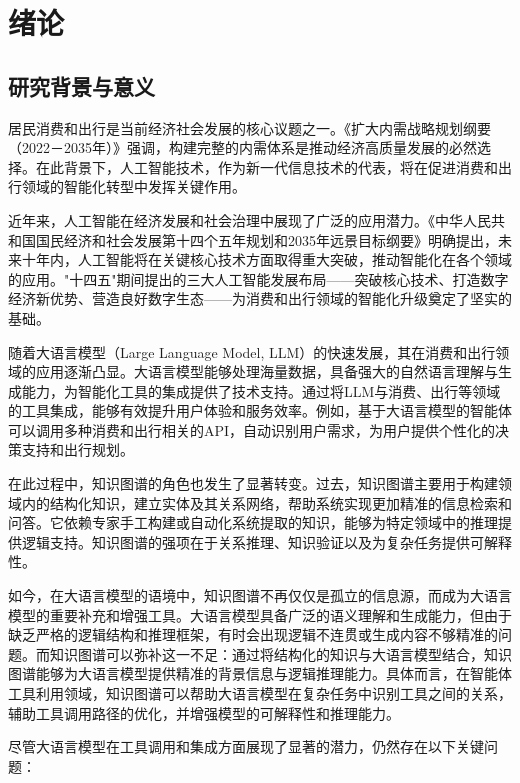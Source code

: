 
\chapter{绪论}

\section{研究背景与意义}

居民消费和出行是当前经济社会发展的核心议题之一。《扩大内需战略规划纲要（2022－2035年）》强调，构建完整的内需体系是推动经济高质量发展的必然选择。在此背景下，人工智能技术，作为新一代信息技术的代表，将在促进消费和出行领域的智能化转型中发挥关键作用。

近年来，人工智能在经济发展和社会治理中展现了广泛的应用潜力。《中华人民共和国国民经济和社会发展第十四个五年规划和2035年远景目标纲要》明确提出，未来十年内，人工智能将在关键核心技术方面取得重大突破，推动智能化在各个领域的应用。"十四五"期间提出的三大人工智能发展布局——突破核心技术、打造数字经济新优势、营造良好数字生态——为消费和出行领域的智能化升级奠定了坚实的基础。

随着大语言模型（Large Language Model, LLM）的快速发展，其在消费和出行领域的应用逐渐凸显。大语言模型能够处理海量数据，具备强大的自然语言理解与生成能力，为智能化工具的集成提供了技术支持。通过将LLM与消费、出行等领域的工具集成，能够有效提升用户体验和服务效率。例如，基于大语言模型的智能体可以调用多种消费和出行相关的API，自动识别用户需求，为用户提供个性化的决策支持和出行规划。

在此过程中，知识图谱的角色也发生了显著转变。过去，知识图谱主要用于构建领域内的结构化知识，建立实体及其关系网络，帮助系统实现更加精准的信息检索和问答。它依赖专家手工构建或自动化系统提取的知识，能够为特定领域中的推理提供逻辑支持。知识图谱的强项在于关系推理、知识验证以及为复杂任务提供可解释性。

如今，在大语言模型的语境中，知识图谱不再仅仅是孤立的信息源，而成为大语言模型的重要补充和增强工具。大语言模型具备广泛的语义理解和生成能力，但由于缺乏严格的逻辑结构和推理框架，有时会出现逻辑不连贯或生成内容不够精准的问题。而知识图谱可以弥补这一不足：通过将结构化的知识与大语言模型结合，知识图谱能够为大语言模型提供精准的背景信息与逻辑推理能力。具体而言，在智能体工具利用领域，知识图谱可以帮助大语言模型在复杂任务中识别工具之间的关系，辅助工具调用路径的优化，并增强模型的可解释性和推理能力。

尽管大语言模型在工具调用和集成方面展现了显著的潜力，仍然存在以下关键问题：

